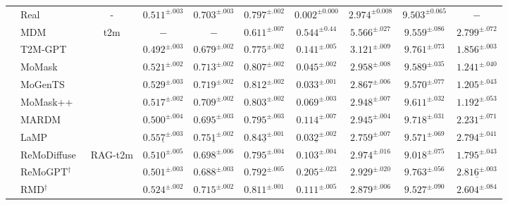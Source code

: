 \documentclass[10pt,journal,compsoc]{IEEEtran}
\begin{document}
\begin{table}[t]
{\begin{tabular}{l|l| c | c c c| c |c| c| c}
        \hline\hline 
        \rule{0pt}{2.5ex} %
        \multirow{14}{*}{\rotatebox{90}{\textbf{HumanML3D}}} &
        Real & - & $0.511^{\pm.003}$ & $0.703^{\pm.003}$  & $0.797^{\pm.002}$ &$0.002^{\pm0.000}$ & $2.974^{\pm0.008}$& $9.503^{\pm0.065}$ & $-$ \\
        \cmidrule{2-10}
        & MDM~\cite{mdm} & \multirow{7}{*}{t2m} & $-$ & $-$  & $0.611^{\pm.007}$ &$0.544^{\pm0.44}$ & $5.566^{\pm.027}$& $9.559^{\pm.086}$ & $2.799^{\pm.072}$ \\
        & T2M-GPT~\cite{t2m-gpt} & &$0.492^{\pm.003}$&$0.679^{\pm.002}$&$0.775^{\pm.002}$&$0.141^{\pm.005}$&$3.121^{\pm.009}$& $9.761^{\pm.073}$ & $1.856^{\pm.003}$ \\ 
        & MoMask~\cite{momask} & &$0.521^{\pm.002}$ & $0.713^{\pm.002}$  &$0.807^{\pm.002}$ & $0.045^{\pm.002}$ &$2.958^{\pm.008}$& $9.589^{\pm.035}$ & $1.241^{\pm.040}$\\
        & MoGenTS~\cite{mogents} & &$0.529^{\pm.003}$ & $0.719^{\pm.002}$& $0.812^{\pm.002}$& $0.033^{\pm.001}$ & $2.867^{\pm.006}$& $9.570^{\pm.077}$ & $1.205^{\pm.043}$\\
        & MoMask++~\cite{momask2} & &$0.517^{\pm.002}$  &$0.709^{\pm.002}$ &$0.803^{\pm.002}$ &$0.069^{\pm.003}$&$2.948^{\pm.007}$ & $9.611^{\pm.032}$ & $1.192^{\pm.053}$\\
        & MARDM~\cite{mardm} & &$0.500^{\pm.004}$ &$0.695^{\pm.003}$&$0.795^{\pm.003}$&$0.114^{\pm.007}$&$2.945^{\pm.004}$&$9.718^{\pm.031}$ & $2.231^{\pm.071}$\\
        & LaMP~\cite{lamp} & &$\underline{0.557^{\pm.003}}$ &$\underline{0.751^{\pm.002}}$&$\underline{0.843^{\pm.001}}$& $\underline{0.032^{\pm.002}}$ &$\mathbf{2.759^{\pm.007}}$&$9.571^{\pm.069}$ & $2.794^{\pm.041}$\\
        \cline{2-10}
        \rule{0pt}{2.5ex} %
        & ReMoDiffuse~\cite{remodiffuse} & \multirow{6}{*}{RAG-t2m} &$0.510^{\pm.005}$& $0.698^{\pm.006}$& $0.795^{\pm.004}$ & $0.103^{\pm.004}$&$2.974^{\pm.016}$& $9.018^{\pm.075}$&$1.795^{\pm.043}$\\
        & ReMoGPT$^{\dag}$~\cite{remogpt} & &$0.501^{\pm.003}$& $0.688^{\pm.003}$& $0.792^{\pm.005}$ & $0.205^{\pm.023}$&$2.929^{\pm.020}$& $9.763^{\pm.056}$&$\underline{2.816^{\pm.003}}$\\
        & RMD$^{\dag}$~\cite{rmd} & &$0.524^{\pm.002}$& $0.715^{\pm.002}$& $0.811^{\pm.001}$ & $0.111^{\pm.005}$&$2.879^{\pm.006}$& $\mathbf{9.527^{\pm.090}}$&$2.604^{\pm.084}$\\

\end{tabular}}
\end{table}
\end{document}
